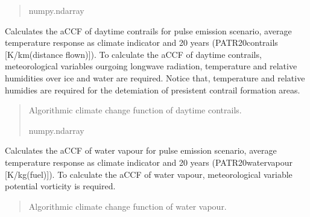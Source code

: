 \documentclass[a4paper,11pt,english]{sphinxmanual}
\begin{document}
\begin{fulllineitems}
\begin{fulllineitems}
\begin{quote}
\begin{description}
\sphinxAtStartPar
numpy.ndarray

\end{description}\end{quote}

\end{fulllineitems}


\begin{fulllineitems}
\label{\detokenize{modules:envlib.accf.GeTaCCFs.accf_dcontrail}}
\pysigstartsignatures
{}
\pysigstopsignatures
\sphinxAtStartPar
Calculates the aCCF of day\sphinxhyphen{}time contrails for pulse emission scenario, average temperature response as
climate indicator and 20 years (P\sphinxhyphen{}ATR20\sphinxhyphen{}contrails {[}K/km(distance flown){]}). To calculate the aCCF of day\sphinxhyphen{}time contrails,
meteorological variables ourgoing longwave radiation, temperature and relative humidities over ice and water
are required. Notice that, temperature and relative humidies are required for the detemiation of presistent
contrail formation areas.
\begin{quote}\begin{description}
\sphinxAtStartPar
Algorithmic climate change function of day\sphinxhyphen{}time contrails.

\sphinxAtStartPar
numpy.ndarray

\end{description}\end{quote}

\end{fulllineitems}


\begin{fulllineitems}
\label{\detokenize{modules:envlib.accf.GeTaCCFs.accf_h2o}}
\pysigstartsignatures
{}
\pysigstopsignatures
\sphinxAtStartPar
Calculates the aCCF of water vapour for pulse emission scenario, average temperature response as
climate indicator and 20 years (P\sphinxhyphen{}ATR20\sphinxhyphen{}water\sphinxhyphen{}vapour {[}K/kg(fuel){]}). To calculate the aCCF of water vapour,
meteorological variable potential vorticity is required.
\begin{quote}\begin{description}
\sphinxAtStartPar
Algorithmic climate change function of water vapour.


\end{description}
\end{quote}
\end{fulllineitems}
\end{fulllineitems}
\end{document}

